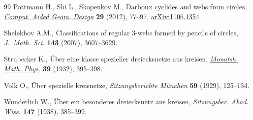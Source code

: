\documentclass[pdftex]{sigma}
\numberwithin{equation}{section}
\begin{document}
\begin{thebibliography}{99}
Pottmann H., Shi L., Skopenkov M., Darboux cyclides and webs from circles,
 \href{https://doi.org/10.1016/j.cagd.2011.10.002}{\textit{Comput. Aided Geom.
 Design}} \textbf{29} (2012), 77--97,
 \href{http://arxiv.org/abs/1106.1354}{arXiv:1106.1354}.

Shelekhov A.M., Classifications of regular 3-webs formed by pencils of circles,
 \href{https://doi.org/10.1007/s10958-007-0225-z}{\textit{J.~Math. Sci.}}
 \textbf{143} (2007), 3607--3629.

Strubecker K., \"{U}ber eine klasse spezieller dreiecksnetze aus kreisen,
 \href{https://doi.org/10.1007/BF01699080}{\textit{Monatsh. Math. Phys.}}
 \textbf{39} (1932), 395--398.

Volk O., \"{U}ber spezielle kreisnetze, \textit{Sitzungsberichte M\"{u}nchen}
 \textbf{59} (1929), 125--134.

Wunderlich W., \"Uber ein besonderes dreiecksnetz aus kreisen,
 \textit{Sitzungsber. Akad. Wiss.} \textbf{147} (1938), 385--399.

\end{thebibliography}\LastPageEnding
\end{document}
